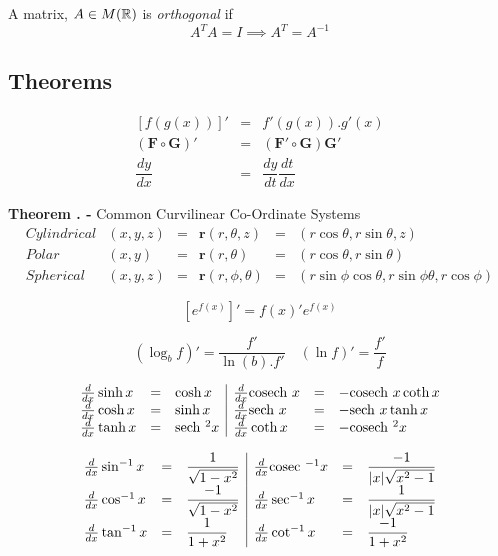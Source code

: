 \documentclass[11pt,a4paper]{article}
\begin{document}
A matrix, $A\in M(\mathbb{R})$ is \textit{orthogonal} if
$$A^TA=I\implies A^T=A^{-1}$$

\subsection{Theorems}

\[\begin{array}{rcl}
[f(g(x))]' &=& f'(g(x)).g'(x)\\
(\textbf{F}\circ\textbf{G})'&=&(\textbf{F}'\circ\textbf{G})\textbf{G}'\\
\dfrac{dy}{dx} &=& \dfrac{dy}{dt}\dfrac{dt}{dx}
\end{array}\]

\textbf{Theorem . - }{Common Curvilinear Co-Ordinate Systems}
\[\begin{array}{rrcccl}
Cylindrical&(x,y,z) &=& \textbf{r}(r,\theta,z) &=& (r\cos\theta,r\sin\theta,z)\\
Polar&(x,y) &=& \textbf{r}(r,\theta) &=& (r\cos\theta,r\sin\theta)\\
Spherical&(x,y,z) &=& \textbf{r}(r,\phi,\theta) &=& (r\sin\phi\cos\theta,r\sin\phi\theta,r\cos\phi)
\end{array}\]

$$[e^{f(x)}]'=f(x)'e^{f(x)}$$

$$(\log_bf)'=\frac{f'}{\ln(b).f'}\quad(\ln f)'=\frac{f'}{f}$$

\[\begin{array}{lcl|lcl}
\frac{d}{dx}\sinh x&=&\cosh x&
\frac{d}{dx}\mathrm{cosech}\  x&=&-\mathrm{cosech}\  x\coth x\\
\frac{d}{dx}\cosh x&=&\sinh x&
\frac{d}{dx}\mathrm{sech}\  x&=&-\mathrm{sech}\  x\tanh x\\
\frac{d}{dx}\tanh x&=&\mathrm{sech}\ ^2 x&
\frac{d}{dx}\coth x&=&-\mathrm{cosech}\ ^2x
\end{array}\]

\[\begin{array}{lcl|lcl}
\frac{d}{dx}\sin^{-1}x&=&\dfrac{1}{\sqrt{1-x^2}}&
\frac{d}{dx}\mathrm{cosec}\ ^{-1}x&=&\dfrac{-1}{|x|\sqrt{x^2-1}}\\
\frac{d}{dx}\cos^{-1}x&=&\dfrac{-1}{\sqrt{1-x^2}}&
\frac{d}{dx}\sec^{-1}x&=&\dfrac{1}{|x|\sqrt{x^2-1}}\\
\frac{d}{dx}\tan^{-1}x&=&\dfrac{1}{1+x^2}&
\frac{d}{dx}\cot^{-1}x&=&\dfrac{-1}{1+x^2}
\end{array}\]
\end{document}
